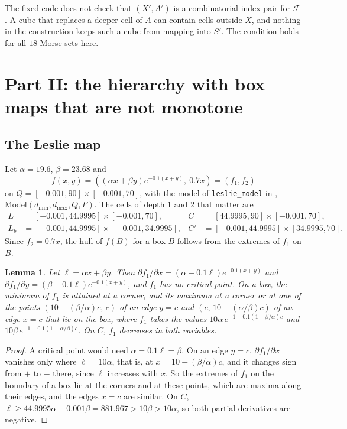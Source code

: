 \documentclass[11pt]{article}
\theoremstyle{plain}
\newtheorem{lemma}[proposition]{Lemma}
\theoremstyle{definition}
\theoremstyle{remark}
\newcommand{\Fc}{\mathcal{F}}
\newcommand{\dmin}{d_{\min}}
\newcommand{\dmax}{d_{\max}}
\newcommand{\code}[1]{\texttt{#1}}
\begin{document}
The fixed code does not check that $(X',A')$ is a combinatorial index pair for $\Fc$. A cube that replaces a deeper cell of $A$ can contain cells outside $X$, and nothing in the construction keeps such a cube from mapping into $S'$. The condition holds for all $18$ Morse sets here.

\section{Part II: the hierarchy with box maps that are not monotone}\label{sec:leslie}

\subsection{The Leslie map}\label{sec:dynamics}

Let $\alpha=19.6$, $\beta=23.68$ and
\[
f(x,y)=\left((\alpha x+\beta y)e^{-0.1(x+y)},\ 0.7x\right)=(f_1,f_2)
\]
on $Q=[-0.001,90]\times[-0.001,70]$, with the model of \code{leslie\_model} in , $\mathrm{Model}(\dmin,\dmax,Q,F)$. The cells of depth $1$ and $2$ that matter are
\[
\begin{aligned}
L&=[-0.001,44.9995]\times[-0.001,70], & C&=[44.9995,90]\times[-0.001,70],\\
L_b&=[-0.001,44.9995]\times[-0.001,34.9995], & C'&=[-0.001,44.9995]\times[34.9995,70].
\end{aligned}
\]
Since $f_2=0.7x$, the hull of $f(B)$ for a box $B$ follows from the extremes of $f_1$ on $B$.

\begin{lemma}\label{lem:hull}
Let $\ell=\alpha x+\beta y$. Then $\partial f_1/\partial x=(\alpha-0.1\ell)e^{-0.1(x+y)}$ and $\partial f_1/\partial y=(\beta-0.1\ell)e^{-0.1(x+y)}$, and $f_1$ has no critical point. On a box, the minimum of $f_1$ is attained at a corner, and its maximum at a corner or at one of the points $(10-(\beta/\alpha)c,\,c)$ of an edge $y=c$ and $(c,\,10-(\alpha/\beta)c)$ of an edge $x=c$ that lie on the box, where $f_1$ takes the values $10\alpha\,e^{-1-0.1(1-\beta/\alpha)c}$ and $10\beta\,e^{-1-0.1(1-\alpha/\beta)c}$. On $C$, $f_1$ decreases in both variables.
\end{lemma}

\begin{proof}
A critical point would need $\alpha=0.1\ell=\beta$. On an edge $y=c$, $\partial f_1/\partial x$ vanishes only where $\ell=10\alpha$, that is, at $x=10-(\beta/\alpha)c$, and it changes sign from $+$ to $-$ there, since $\ell$ increases with $x$. So the extremes of $f_1$ on the boundary of a box lie at the corners and at these points, which are maxima along their edges, and the edges $x=c$ are similar. On $C$, $\ell\geq44.9995\alpha-0.001\beta=881.967>10\beta>10\alpha$, so both partial derivatives are negative.
\end{proof}
\end{document}
